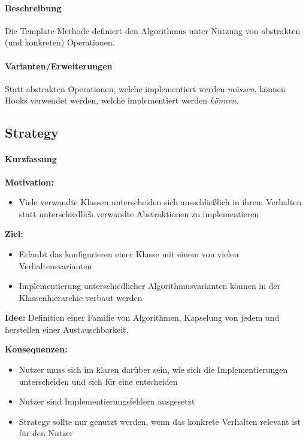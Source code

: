			\paragraph{Beschreibung}
				Die Template-Methode definiert den Algorithmus unter Nutzung von abstrakten (und konkreten) Operationen.

			\paragraph{Varianten/Erweiterungen}
				Statt abstrakten Operationen, welche implementiert werden \textit{müssen}, können Hooks verwendet werden, welche implementiert werden \textit{können}.

		\subsection{Strategy}
			\paragraph{Kurzfassung}
				\textbf{Motivation:}
				\begin{itemize}
					\item Viele verwandte Klassen unterscheiden sich ausschließlich in ihrem Verhalten statt unterschiedlich verwandte Abstraktionen zu implementieren
				\end{itemize}

				\textbf{Ziel:}
				\begin{itemize}
					\item Erlaubt das konfigurieren einer Klasse mit einem von vielen Verhaltensvarianten
					\item Implementierung unterschiedlicher Algorithmusvarianten können in der Klassenhierarchie verbaut werden
				\end{itemize}

				\textbf{Idee:} Definition einer Familie von Algorithmen, Kapselung von jedem und herstellen einer Austauschbarkeit.

				\textbf{Konsequenzen:}
				\begin{itemize}
					\item Nutzer muss sich im klaren darüber sein, wie sich die Implementierungen unterscheiden und sich für eine entscheiden
					\item Nutzer sind Implementierungsfehlern ausgesetzt
					\item Strategy sollte nur genutzt werden, wenn das konkrete Verhalten relevant ist für den Nutzer
				\end{itemize}

